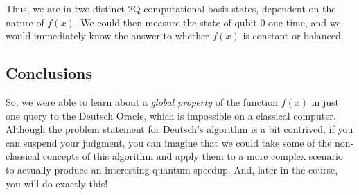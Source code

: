 \documentclass[12pt, letterpaper]{article}
\begin{document}
\noindent
Thus, we are in two distinct 2Q computational basis states, dependent on the nature of $f(x)$. We could then measure the state of qubit 0 one time, and we would immediately know the answer to whether $f(x)$ is constant or balanced.

\subsection{Conclusions}

So, we were able to learn about a \textit{global property} of the function $f(x)$ in just one query to the Deutsch Oracle, which is impossible on a classical computer. Although the problem statement for Deutsch's algorithm is a bit contrived, if you can suspend your judgment, you can imagine that we could take some of the non-classical concepts of this algorithm and apply them to a more complex scenario to actually produce an interesting quantum speedup. And, later in the course, you will do exactly this!
\end{document}
